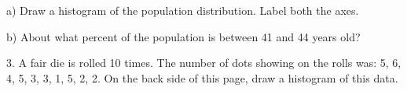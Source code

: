 \documentclass[10pt]{article}
\begin{document}
\hspace{5pt} a) Draw a histogram of the population distribution.  Label
both the axes.

\hspace{5pt} b) About what percent of the population is between 41 and 44 years old?
\vspace{.5in}


3. A fair die is rolled 10 times.  The number of dots showing on the rolls
was:  5, 6, 4, 5, 3, 3, 1, 5, 2, 2. On the back side of this page, 
draw a histogram of this data.

\vfill
\eject
\end{document}
